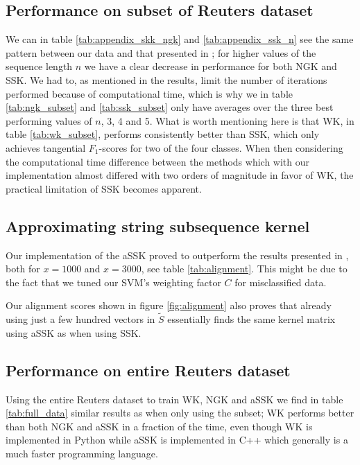 \subsection{Performance on subset of Reuters dataset}
We can in table \ref{tab:appendix_skk_ngk} and \ref{tab:appendix_ssk_n} see the same pattern between our data and that presented in \cite{lodhi}; for higher values of the sequence length $ n $ we have a clear decrease in performance for both NGK and SSK. We had to, as mentioned in the results, limit the number of iterations performed because of computational time, which is why we in table \ref{tab:ngk_subset} and \ref{tab:ssk_subset} only have averages over the three best performing values of $ n $, 3, 4 and 5. What is worth mentioning here is that WK, in table \ref{tab:wk_subset}, performs consistently better than SSK, which only achieves tangential $ F_1 $-scores for two of the four classes. When then considering the computational time difference between the methods which with our implementation almost differed with two orders of magnitude in favor of WK, the practical limitation of SSK becomes apparent. 

\subsection{Approximating string subsequence kernel}
Our implementation of the aSSK proved to outperform the results presented in \cite{lodhi}, both for $ x=1000 $ and $ x=3000 $, see table \ref{tab:alignment}. This might be due to the fact that we tuned our SVM's weighting factor $ C $ for misclassified data. 

Our alignment scores shown in figure \ref{fig:alignment} also proves that already using just a few hundred vectors in $ \tilde{S} $ essentially finds the same kernel matrix using aSSK as when using SSK.

\subsection{Performance on entire Reuters dataset}
Using the entire Reuters dataset to train WK, NGK and aSSK we find in table \ref{tab:full_data} similar results as when only using the subset; WK performs better than both NGK and aSSK in a fraction of the time, even though WK is implemented in Python while aSSK is implemented in C++ which generally is a much faster programming language. 


